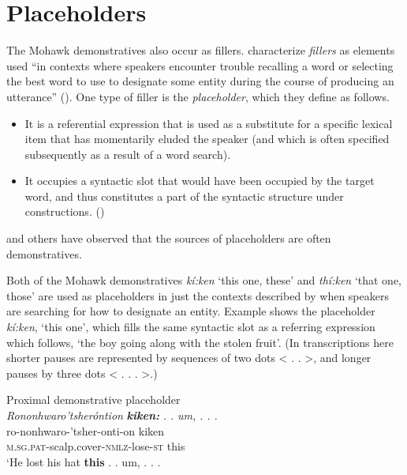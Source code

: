 \documentclass[output=paper]{langscibook}
\begin{document}
\section{Placeholders}
\label{sec:mithun:4}
The Mohawk demonstratives also occur as fillers. \citet{HayashiYoon2006} characterize \textit{fillers} as elements used “in contexts where speakers encounter trouble recalling a word or selecting the best word to use to designate some entity during the course of producing an utterance” (\citeyear[485]{HayashiYoon2006}). One type of filler is the \textit{placeholder}, which they define as follows.

\begin{itemize}
\item It is a referential expression that is used as a substitute for a specific lexical item that has momentarily eluded the speaker (and which is often specified subsequently as a result of a word search).
\item It occupies a syntactic slot that would have been occupied by the target word, and thus constitutes a part of the syntactic structure under constructions. (\citealt[490]{HayashiYoon2006})
\end{itemize}

\citet{HayashiYoon2006} and others have observed that the sources of placeholders are often demonstratives.

\largerpage
Both of the Mohawk demonstratives \textit{kí:ken} ‘this one, these’ and \textit{thí:ken} ‘that one, those’ are used as placeholders in just the contexts described by \citet{HayashiYoon2006} when speakers are searching for how to designate an entity. Example  shows the placeholder \textit{kí:ken}, ‘this one’, which fills the same syntactic slot as a referring expression which follows, ‘the boy going along with the stolen fruit’. (In transcriptions here shorter pauses are represented by sequences of two dots < . . >, and longer pauses by three dots < . . . >.) 

\ea%
\label{ex:mithun:13}
Proximal demonstrative placeholder\\
\glll \textit{Rononhwaro’tsheróntion} \textbf{\textit{kiken:}} \textit{. .}  \textit{um,}    \textit{. . .}\\
ro-nonhwaro-’tsher-onti-on          kiken {} {} {}\\
\textsc{m.sg.pat}{}-scalp.cover-\textsc{nmlz}{}-lose-\textsc{st}    this {} {} {}\\
\glt ‘He lost his hat \textbf{this}  . . um,    . . .\\
~\\
\end{document}

